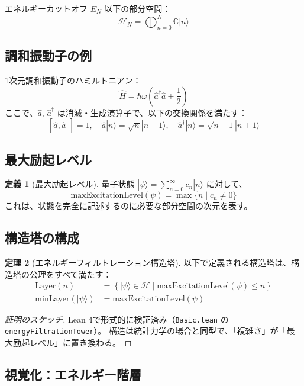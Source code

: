\documentclass[a4paper,12pt]{ltjsarticle}
\theoremstyle{definition}
\newtheorem{theorem}{定理}[section]
\newtheorem{definition}[theorem]{定義}
\newcommand{\C}{\mathbb{C}}
\newcommand{\Hilbert}{\mathcal{H}}
\newcommand{\Layer}{\mathrm{Layer}}
\newcommand{\minLayer}{\mathrm{minLayer}}
\begin{document}
エネルギーカットオフ $E_N$ 以下の部分空間：
\[
\Hilbert_N = \bigoplus_{n=0}^{N} \C |n\rangle
\]

\subsection{調和振動子の例}

1次元調和振動子のハミルトニアン：
\[
\hat{H} = \hbar\omega \left( \hat{a}^\dagger \hat{a} + \frac{1}{2} \right)
\]
ここで、$\hat{a}$, $\hat{a}^\dagger$ は消滅・生成演算子で、以下の交換関係を満たす：
\[
[\hat{a}, \hat{a}^\dagger] = 1, \quad \hat{a}|n\rangle = \sqrt{n}|n-1\rangle, \quad \hat{a}^\dagger|n\rangle = \sqrt{n+1}|n+1\rangle
\]

\subsection{最大励起レベル}

\begin{definition}[最大励起レベル]
量子状態 $|\psi\rangle = \sum_{n=0}^{\infty} c_n |n\rangle$ に対して、
\[
\mathrm{maxExcitationLevel}(\psi) = \max\{ n \mid c_n \neq 0 \}
\]
これは、状態を完全に記述するのに必要な部分空間の次元を表す。
\end{definition}

\subsection{構造塔の構成}

\begin{theorem}[エネルギーフィルトレーション構造塔]
以下で定義される構造塔は、構造塔の公理をすべて満たす：
\begin{align*}
\Layer(n) &= \left\{ |\psi\rangle \in \Hilbert \mid \mathrm{maxExcitationLevel}(\psi) \leq n \right\} \\
\minLayer(|\psi\rangle) &= \mathrm{maxExcitationLevel}(\psi)
\end{align*}
\end{theorem}

\begin{proof}[証明のスケッチ]
Lean 4で形式的に検証済み（\texttt{Basic.lean} の \texttt{energyFiltrationTower}）。
構造は統計力学の場合と同型で、「複雑さ」が「最大励起レベル」に置き換わる。
\end{proof}

\subsection{視覚化：エネルギー階層}
\end{document}
